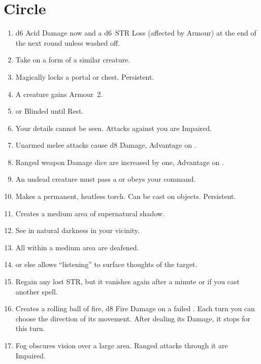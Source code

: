 \documentclass[itdr]{subfiles}
\begin{document}

\vfill
\break

\section{ Circle}
\def \spellcircle {2}
\begin{enumerate}
	\item {} d6 Acid Damage now and a d6~STR Loss (affected by Armour) at the end of the next round unless washed off.
	\item {} Take on a form of a similar creature.
	\item {} Magically locks a portal or chest. Persistent.
	\item {} A creature gains Armour~2.
	\item {}  or Blinded until Rest.
	\item {} Your details cannot be seen. Attacks against you are Impaired.
	\item {} Unarmed melee attacks cause d8 Damage, Advantage on .
	\item {} Ranged weapon Damage dice are increased by one, Advantage on .
	\item {} An undead creature must pass a  or obeys your command.
	\item {} Makes a permanent, heatless torch. Can be cast on objects. Persistent.
	\item {} Creates a medium area of supernatural shadow.
	\item {} See in natural darkness in your vicinity.
	\item {} All within a medium area are deafened.
	\item {}  or else allows \mbox{``listening''} to surface thoughts of the target.
	\item {} Regain any lost STR, but it vanishes again after a minute or if you cast another spell.
	\item {} Creates a rolling ball of fire, d8 Fire Damage on a failed . Each turn you can choose the direction of its movement. After dealing its Damage, it stops for this turn.
	\item {} Fog obscures vision over a large area. Ranged attacks through it are Impaired.

\end{enumerate}
\end{document}
